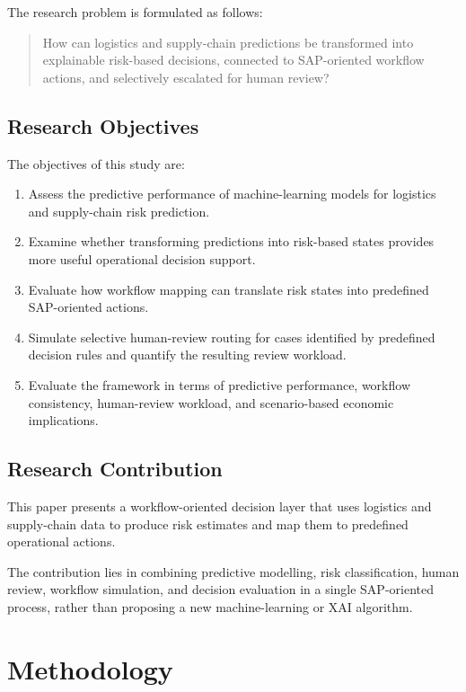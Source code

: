 \documentclass[10pt,a4paper]{article}
\begin{document}
The research problem is formulated as follows:

\begin{quote}
How can logistics and supply-chain predictions be transformed into explainable risk-based decisions, connected to SAP-oriented workflow actions, and selectively escalated for human review?
\end{quote}

\subsection{Research Objectives}

The objectives of this study are:

\begin{enumerate}
\item Assess the predictive performance of machine-learning models for logistics and supply-chain risk prediction.
\item Examine whether transforming predictions into risk-based states provides more useful operational decision support.
\item Evaluate how workflow mapping can translate risk states into predefined SAP-oriented actions.
\item Simulate selective human-review routing for cases identified by predefined decision rules and quantify the resulting review workload.
\item Evaluate the framework in terms of predictive performance, workflow consistency, human-review workload, and scenario-based economic implications.
\end{enumerate}


\subsection{Research Contribution}

This paper presents a workflow-oriented decision layer that uses
logistics and supply-chain data to produce risk estimates and map them
to predefined operational actions.

The contribution lies in combining predictive modelling, risk
classification, human review, workflow simulation, and decision
evaluation in a single SAP-oriented process, rather than proposing a
new machine-learning or XAI algorithm.

\section{Methodology}
\end{document}
